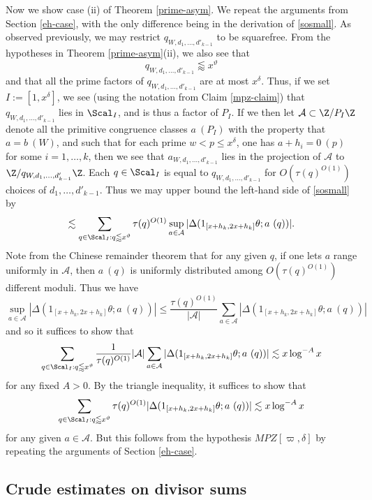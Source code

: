 Now we show case (ii) of Theorem \ref{prime-asym}.  We repeat the arguments from Section \ref{eh-case}, with the only difference being in the derivation of \eqref{sosmall}.  As observed previously, we may restrict $q_{W,d_1,\dots,d'_{k-1}}$ to be squarefree.  From the hypotheses in Theorem \ref{prime-asym}(ii), we also see that
$$ q_{W,d_1,\dots,d'_{k-1}} \lessapprox x^\vartheta$$
and that all the prime factors of $q_{W,d_1,\dots,d'_{k-1}}$ are at most $x^\delta$.  Thus, if we set $I := [1,x^\delta]$, we see (using the notation from Claim \ref{mpz-claim}) that $q_{W,d_1,\dots,d'_{k-1}}$ lies in $\Scal_I$, and is thus a factor of $P_I$.  If we then let ${\mathcal A} \subset \Z/P_I\Z$ denote all the primitive congruence classes $a\ (P_I)$ with the property that $a = b\ (W)$, and such that for each prime $w < p \leq x^\delta$, one has $a + h_i = 0\ (p)$ for some $i=1,\dots,k$, then we see that $a_{W,d_1,\dots,d'_{k-1}}$ lies in the projection of ${\mathcal A}$ to $\Z/q_{W,d_1,\dots,d'_{k-1}}\Z$.  Each $q \in \Scal_I$ is equal to $q_{W,d_1,\dots,d'_{k-1}}$ for $O(\tau(q)^{O(1)})$ choices of $d_1,\dots,d'_{k-1}$.  Thus we may upper bound the left-hand side of \eqref{sosmall} by
$$ \lesssim \sum_{q \in \Scal_I: q \lessapprox x^\vartheta} \tau(q)^{O(1)} \sup_{a \in {\mathcal A}}
|\Delta( 1_{[x+h_k,2x+h_k]} \theta;  a\ (q))|.$$
Note from the Chinese remainder theorem that for any given $q$, if one lets $a$ range uniformly in ${\mathcal A}$, then $a\ (q)$ is uniformly distributed among $O( \tau(q)^{O(1)})$ different moduli.  Thus we have
$$
\sup_{a \in {\mathcal A}}
|\Delta( 1_{[x+h_k,2x+h_k]} \theta;  a\ (q))| \leq \frac{\tau(q)^{O(1)}}{|{\mathcal A}|} \sum_{a \in {\mathcal A}} |\Delta( 1_{[x+h_k,2x+h_k]} \theta;  a\ (q))| $$
and so it suffices to show that
$$
\sum_{q \in \Scal_I: q \lessapprox x^\vartheta} \frac{1}{\tau(q)^{O(1)}}{|{\mathcal A}|} \sum_{a \in {\mathcal A}}
|\Delta( 1_{[x+h_k,2x+h_k]} \theta;  a\ (q))|\lesssim x \log^{-A} x$$
for any fixed $A>0$.  By the triangle inequality, it suffices to show that
$$
\sum_{q \in \Scal_I: q \lessapprox x^\vartheta} \tau(q)^{O(1)}
|\Delta( 1_{[x+h_k,2x+h_k]} \theta;  a\ (q))|\lesssim x \log^{-A} x$$
for any given $a \in {\mathcal A}$.  But this follows from the hypothesis $MPZ[\varpi,\delta]$ by repeating the arguments of Section \ref{eh-case}.

\subsection{Crude estimates on divisor sums}

